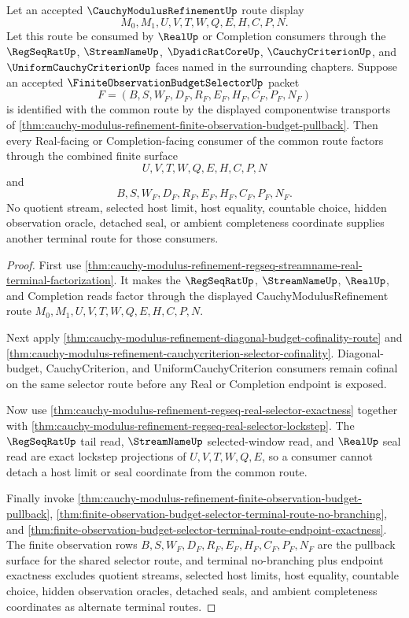 \begin{theorem}
\label{thm:cauchy-modulus-refinement-terminal-budget-route-exhaustion}
Let an accepted $\CauchyModulusRefinementUp$ route display
$$
M_0,M_1,U,V,T,W,Q,E,H,C,P,N.
$$
Let this route be consumed by $\RealUp$ or Completion consumers through the $\RegSeqRatUp$, $\StreamNameUp$, $\DyadicRatCoreUp$, $\CauchyCriterionUp$, and $\UniformCauchyCriterionUp$ faces named in the surrounding chapters. Suppose an accepted $\FiniteObservationBudgetSelectorUp$ packet
$$
F=(B,S,W_F,D_F,R_F,E_F,H_F,C_F,P_F,N_F)
$$
is identified with the common route by the displayed componentwise transports of \autoref{thm:cauchy-modulus-refinement-finite-observation-budget-pullback}. Then every Real-facing or Completion-facing consumer of the common route factors through the combined finite surface
$$
U,V,T,W,Q,E,H,C,P,N
$$
and
$$
B,S,W_F,D_F,R_F,E_F,H_F,C_F,P_F,N_F.
$$
No quotient stream, selected host limit, host equality, countable choice, hidden observation oracle, detached seal, or ambient completeness coordinate supplies another terminal route for those consumers.
\end{theorem}
\begin{proof}
First use \autoref{thm:cauchy-modulus-refinement-regseq-streamname-real-terminal-factorization}. It makes the $\RegSeqRatUp$, $\StreamNameUp$, $\RealUp$, and Completion reads factor through the displayed CauchyModulusRefinement route $M_0,M_1,U,V,T,W,Q,E,H,C,P,N$.

Next apply \autoref{thm:cauchy-modulus-refinement-diagonal-budget-cofinality-route} and \autoref{thm:cauchy-modulus-refinement-cauchycriterion-selector-cofinality}. Diagonal-budget, CauchyCriterion, and UniformCauchyCriterion consumers remain cofinal on the same selector route before any Real or Completion endpoint is exposed.

Now use \autoref{thm:cauchy-modulus-refinement-regseq-real-selector-exactness} together with \autoref{thm:cauchy-modulus-refinement-regseq-real-selector-lockstep}. The $\RegSeqRatUp$ tail read, $\StreamNameUp$ selected-window read, and $\RealUp$ seal read are exact lockstep projections of $U,V,T,W,Q,E$, so a consumer cannot detach a host limit or seal coordinate from the common route.

Finally invoke \autoref{thm:cauchy-modulus-refinement-finite-observation-budget-pullback}, \autoref{thm:finite-observation-budget-selector-terminal-route-no-branching}, and \autoref{thm:finite-observation-budget-selector-terminal-route-endpoint-exactness}. The finite observation rows $B,S,W_F,D_F,R_F,E_F,H_F,C_F,P_F,N_F$ are the pullback surface for the shared selector route, and terminal no-branching plus endpoint exactness excludes quotient streams, selected host limits, host equality, countable choice, hidden observation oracles, detached seals, and ambient completeness coordinates as alternate terminal routes.
\end{proof}

